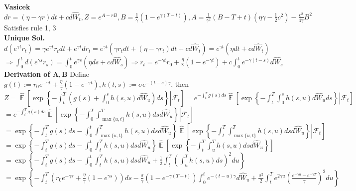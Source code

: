 \documentclass[12pt,landscape, a4paper]{article}
\theoremstyle{remark}
\newcommand{\E}{\operatorname{\mathbb{E}}}
\begin{document}
\begin{multicols*}{3}
\textbf{Vasicek} $dr = (\eta - \gamma r) dt + cd\hat{W}_t, Z = e^{A-rB}, B = \frac{1}{\gamma} \left(1 - e^{\gamma (T-t)} \right), A = \frac{1}{\gamma^2} (B-T+t) (\eta \gamma - \frac{1}{2} c^2) - \frac{c^2}{4\gamma} B^2$\\
Satisfies rule 1, 3\\
\textbf{Unique Sol.} $d (e^{\gamma t}r_t) = \gamma e^{\gamma t} r_t dt + e^{\gamma t} d r_t = e^{\gamma t} (\gamma r_t dt + (\eta - \gamma r_t) dt + cd\hat{W}_t) = e^{\gamma t} (\eta dt + cd \hat{W}_t)$\\
$\Rightarrow \int^t_0 d (e^{\gamma s}r_s) = \int^t_0 e^{\gamma s} (\eta ds + cd \hat{W}_s) \Rightarrow r_t = e^{-\gamma t} r_0 + \frac{\eta}{\gamma} (1 - e^{-\gamma t}) + c\int^t_0 e^{-\gamma (t-s)} d\hat{W}_s $\\ 
\textbf{Derivation of $\mathbf{A, B}$} Define $g(t):= r_0 e^{-\gamma t} + \frac{\eta}{\gamma} (1- e^{-\gamma t}), h(t, s):= \sigma e^{- (t-s) \gamma} $, then\\
$Z = \hat{\E} \left[ \left. \exp\left\{-\int^T_t \left( g(s) + \int^s_0 h(s, u) d \hat{W}_u \right) ds \right\}  \right\rvert \mathcal{F}_t \right] = e^{-\int^T_t g(s) ds } \hat{\E} \left[ \left. \exp \left\{-\int^T_t \int^s_0 h(s, u) d \hat{W}_u  ds\right\} \right\rvert \mathcal{F}_t \right] $\\
$=e^{-\int^T_t g(s) ds } \hat{\E} \left[ \left. \exp \left\{-\int^T_0 \int^T_{\max \{u, t \}} h(s, u) ds  d \hat{W}_u  \right\}  \right\rvert\mathcal{F}_t \right]$\\
$= \exp \left\{-\int^T_t g(s) ds -\int^t_0 \int^T_{\max \{u, t \}} h(s, u) ds  d \hat{W}_u \right\}  \hat{\E} \left[ \left. \exp \left\{-\int^T_t \int^T_{\max \{u, t \}} h(s, u) ds  d \hat{W}_u  \right\}  \right\rvert\mathcal{F}_t \right] $\\
$=\exp \left\{-\int^T_t g(s) ds -\int^t_0 \int^T_t h(s, u) ds  d \hat{W}_u \right\}  \hat{\E} \left[ \exp \left\{-\int^T_t \int^T_u h(s, u) ds  d \hat{W}_u  \right\}  \right]$\\
$=\exp \left\{ -\int^T_t g(s) ds - \int^t_0 \int^T_t h(s, u) ds  d \hat{W}_u + \frac{1}{2} \int^T_t \left( \int^T_u h(s, u) ds \right)^2 du \right\}$\\
$=\exp \left\{ -\int^T_t \left( r_0 e^{-\gamma s } + \frac{\eta}{\gamma} (1 - e^{\gamma s}) \right) ds - \frac{\sigma}{\gamma} (1 - e^{-\gamma (T-t)}) \int^t_0 e^{-(t-u) \gamma} d \hat{W}_u + \frac{\sigma^2}{2} \int^T_t e^{2\gamma u} \left( \frac{e^{-\gamma u} - e^{-\gamma T}}{\gamma}  \right)^2  du \right\} $\\

\end{multicols*}
\end{document}

